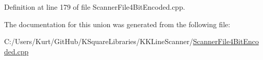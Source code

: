 Definition at line 179 of file Scanner\+File4\+Bit\+Encoded.\+cpp.



The documentation for this union was generated from the following file\+:\begin{DoxyCompactItemize}
\item 
C\+:/\+Users/\+Kurt/\+Git\+Hub/\+K\+Square\+Libraries/\+K\+K\+Line\+Scanner/\hyperlink{_scanner_file4_bit_encoded_8cpp}{Scanner\+File4\+Bit\+Encoded.\+cpp}\end{DoxyCompactItemize}
